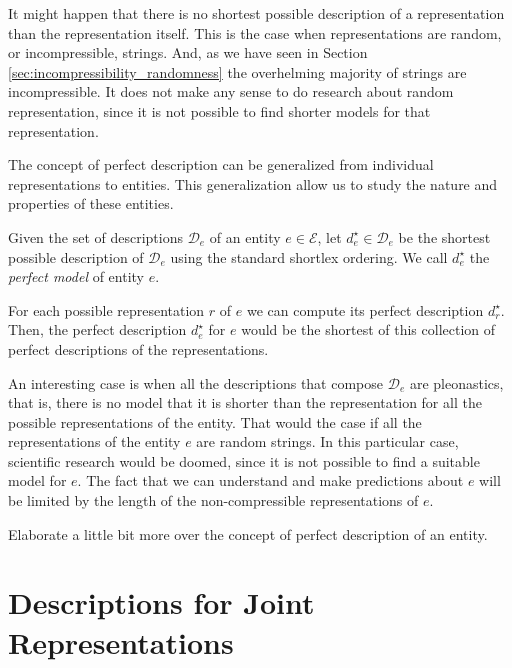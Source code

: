 It might happen that there is no shortest possible description of a representation than the representation itself. This is the case when representations are random, or incompressible, strings. And, as we have seen in Section \ref{sec:incompressibility_randomness} the overhelming majority of strings are incompressible. It does not make any sense to do research about random representation, since it is not possible to find shorter models for that representation.

The concept of perfect description can be generalized from individual representations to entities. This generalization allow us to study the nature and properties of these entities.

\begin{definition}
\label{def:entities_perfect_model}
Given the set of descriptions $\mathcal{D}_e$ of an entity $e \in \mathcal{E}$, let $d_e^{\star} \in \mathcal{D}_e$ be the shortest possible description of $\mathcal{D}_e$ using the standard shortlex ordering. We call $d_e^{\star}$ the \emph{perfect model} of entity $e$.
\end{definition}

For each possible representation $r$ of $e$ we can compute its perfect description $d_r^{\star}$. Then, the perfect description $d_e^{\star}$ for $e$ would be the shortest of this collection of perfect descriptions of the representations.

An interesting case is when all the descriptions that compose $\mathcal{D}_e$ are pleonastics, that is, there is no model that it is shorter than the representation for all the possible representations of the entity. That would the case if all the representations of the entity $e$ are random strings. In this particular case, scientific research would be doomed, since it is not possible to find a suitable model for $e$. The fact that we can understand and make predictions about $e$ will be limited by the length of the non-compressible representations of $e$.

{\color{red} Elaborate a little bit more over the concept of perfect description of an entity.}

%
%

\section{Descriptions for Joint Representations}
\label{sec:description_joint_represenation}

